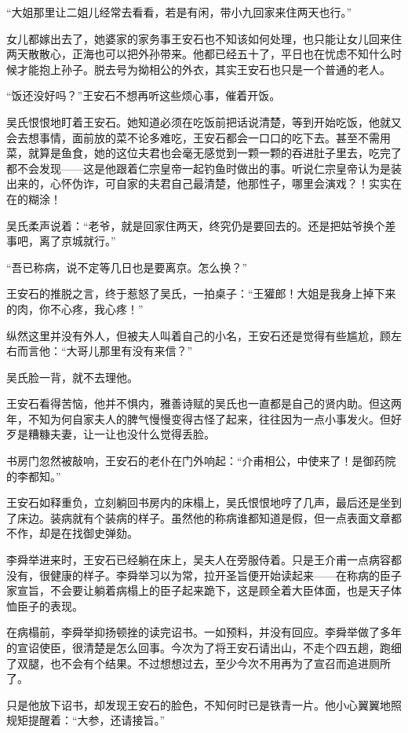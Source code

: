 “大姐那里让二姐儿经常去看看，若是有闲，带小九回家来住两天也行。”

女儿都嫁出去了，她婆家的家务事王安石也不知该如何处理，也只能让女儿回来住两天散散心，正海也可以把外孙带来。他都已经五十了，平日也在忧虑不知什么时候才能抱上孙子。脱去号为拗相公的外衣，其实王安石也只是一个普通的老人。

“饭还没好吗？”王安石不想再听这些烦心事，催着开饭。

吴氏恨恨地盯着王安石。她知道必须在吃饭前把话说清楚，等到开始吃饭，他就又会去想事情，面前放的菜不论多难吃，王安石都会一口口的吃下去。甚至不需用菜，就算是鱼食，她的这位夫君也会毫无感觉到一颗一颗的吞进肚子里去，吃完了都不会发现——这是他跟着仁宗皇帝一起钓鱼时做出的事。听说仁宗皇帝认为是装出来的，心怀伪诈，可自家的夫君自己最清楚，他那性子，哪里会演戏？！实实在在的糊涂！

吴氏柔声说着：“老爷，就是回家住两天，终究仍是要回去的。还是把姑爷换个差事吧，离了京城就行。”

“吾已称病，说不定等几日也是要离京。怎么换？”

王安石的推脱之言，终于惹怒了吴氏，一拍桌子：“王獾郎！大姐是我身上掉下来的肉，你不心疼，我心疼！”

纵然这里并没有外人，但被夫人叫着自己的小名，王安石还是觉得有些尴尬，顾左右而言他：“大哥儿那里有没有来信？”

吴氏脸一背，就不去理他。

王安石看得苦恼，他并不惧内，雅善诗赋的吴氏也一直都是自己的贤内助。但这两年，不知为何自家夫人的脾气慢慢变得古怪了起来，往往因为一点小事发火。但好歹是糟糠夫妻，让一让也没什么觉得丢脸。

书房门忽然被敲响，王安石的老仆在门外响起：“介甫相公，中使来了！是御药院的李都知。”

王安石如释重负，立刻躺回书房内的床榻上，吴氏恨恨地哼了几声，最后还是坐到了床边。装病就有个装病的样子。虽然他的称病谁都知道是假，但一点表面文章都不作，却是在找御史弹劾。

李舜举进来时，王安石已经躺在床上，吴夫人在旁服侍着。只是王介甫一点病容都没有，很健康的样子。李舜举习以为常，拉开圣旨便开始读起来——在称病的臣子家宣旨，不会要让躺着病榻上的臣子起来跪下，这是顾全着大臣体面，也是天子体恤臣子的表现。

在病榻前，李舜举抑扬顿挫的读完诏书。一如预料，并没有回应。李舜举做了多年的宣诏使臣，很清楚是怎么回事。今次为了将王安石请出山，不走个四五趟，跑细了双腿，也不会有个结果。不过想想过去，至少今次不用再为了宣召而追进厕所了。

只是他放下诏书，却发现王安石的脸色，不知何时已是铁青一片。他小心翼翼地照规矩提醒着：“大参，还请接旨。”


